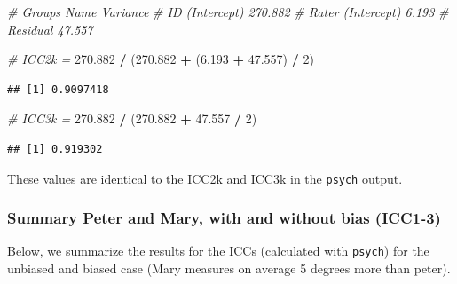 \documentclass[
]{article}
\newenvironment{Shaded}{\begin{snugshade}}{\end{snugshade}}
\newcommand{\CommentTok}[1]{\textcolor[rgb]{0.56,0.35,0.01}{\textit{#1}}}
\newcommand{\DecValTok}[1]{\textcolor[rgb]{0.00,0.00,0.81}{#1}}
\newcommand{\FloatTok}[1]{\textcolor[rgb]{0.00,0.00,0.81}{#1}}
\newcommand{\NormalTok}[1]{#1}
\newcommand{\SpecialCharTok}[1]{\textcolor[rgb]{0.81,0.36,0.00}{\textbf{#1}}}
\begin{document}
\begin{Shaded}
\begin{Highlighting}[]
\CommentTok{\# Groups   Name        Variance}
\CommentTok{\# ID       (Intercept) 270.882 }
\CommentTok{\# Rater    (Intercept)   6.193 }
\CommentTok{\# Residual              47.557 }

\CommentTok{\# ICC2k =}
\FloatTok{270.882} \SpecialCharTok{/}\NormalTok{ (}\FloatTok{270.882} \SpecialCharTok{+}\NormalTok{ (}\FloatTok{6.193} \SpecialCharTok{+} \FloatTok{47.557}\NormalTok{) }\SpecialCharTok{/} \DecValTok{2}\NormalTok{)}
\end{Highlighting}
\end{Shaded}

\begin{verbatim}
## [1] 0.9097418
\end{verbatim}

\begin{Shaded}
\begin{Highlighting}[]
\CommentTok{\# ICC3k =}
\FloatTok{270.882} \SpecialCharTok{/}\NormalTok{ (}\FloatTok{270.882} \SpecialCharTok{+} \FloatTok{47.557} \SpecialCharTok{/} \DecValTok{2}\NormalTok{)}
\end{Highlighting}
\end{Shaded}

\begin{verbatim}
## [1] 0.919302
\end{verbatim}

These values are identical to the ICC2k and ICC3k in the \texttt{psych} output.

\subsubsection{Summary Peter and Mary, with and without bias (ICC1-3)}\label{summary-peter-and-mary-with-and-without-bias-icc1-3}

Below, we summarize the results for the ICCs (calculated with \texttt{psych})
for the unbiased and biased case (Mary measures on average 5 degrees more than peter).
\end{document}
